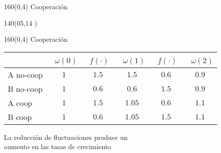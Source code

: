\documentclass[shownotes,aspectratio=169]{beamer}
\begin{document}
\begin{frame}[plain]
\begin{textblock}{160}(0,4)
 \centering \LARGE
 Cooperación
\end{textblock}
\vspace{1.3cm}

\centering

\begin{textblock}{140}(05,14
 )
\end{textblock}



\end{frame}

\begin{frame}[plain]
\begin{textblock}{160}(0,4)
 \centering \LARGE
 Cooperación
\end{textblock}
\vspace{1.3cm} \centering

 \begin{tabular}{|l|c|c|c|c|c|}
     \hline
         & {\small \, $\omega(0)$ } & {\small \  $f(\cdot) \ $}  & {\small \, $\omega(1)$ } & {\small \  $f(\cdot) \ $}  & {\small \,  $\omega(2)$ }  \\ \hline \hline
        A no-coop& $1$ & $1.5$ &  $1.5$ & $0.6$ & $\bm{0.9}$ \\ \hline
        B no-coop & $1$ & $0.6$ & $0.6$ & $1.5$ & $\bm{0.9}$ \\ \hline\hline
        A coop & $1$ & $1.5$ & $1.05$ & $0.6$ & $\bm{1.1}$ \\ \hline
        B coop & $1$ & $0.6$ & $1.05$ & $1.5$ & $\bm{1.1}$\\ \hline
    \end{tabular}
    
    \pause
    
    \vspace{1cm}
    
    \Large
    
    La reducción de fluctuaciones produce un \\  aumento en las tasas de crecimiento

\end{frame}
\end{document}
